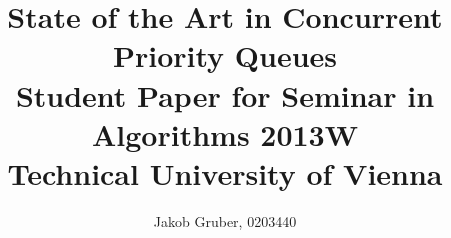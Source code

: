 \documentclass[a4paper,10pt]{article}
\title{State of the Art in Concurrent Priority Queues \\
       Student Paper for Seminar in Algorithms 2013W \\
       Technical University of Vienna}
\author{Jakob Gruber, 0203440}
\begin{document}
\maketitle

\begin{comment}
Abstract formula
----------------

1) big picture problem or topic widely debated in your field.
2) gap in the literature on this topic.
3) your project filling the gap.
4) the specific material that you examine in the paper.
5) your original argument.
6) a strong concluding sentence.

Introduction formula
--------------------

A good paper introduction is fairly formulaic. If you follow a simple set of
rules, you can write a very good introduction. The following outline can be
varied. For example, you can use two paragraphs instead of one, or you can
place more emphasis on one aspect of the intro than another. But in all cases,
all of the points below need to be covered in an introduction, and in most
papers, you don't need to cover anything more in an introduction.

Paragraph 1: Motivation. At a high level, what is the problem area you are
working in and why is it important? It is important to set the larger context
here. Why is the problem of interest and importance to the larger community?

Paragraph 2: What is the specific problem considered in this paper? This
paragraph narrows down the topic area of the paper. In the first paragraph you
have established general context and importance. Here you establish specific
context and background.

Paragraph 3: "In this paper, we show that ...". This is the key paragraph in
the intro - you summarize, in one paragraph, what are the main contributions of
your paper given the context you have established in paragraphs 1 and 2. What
is the general approach taken? Why are the specific results significant? This
paragraph must be really really good. If you can't "sell" your work at a high
level in a paragraph in the intro, then you are in trouble. As a reader or
reviewer, this is the paragraph that I always look for, and read very
carefully.

You should think about how to structure this one or two paragraph summary of
what your paper is all about. If there are two or three main results, then you
might consider itemizing them with bullets or in test (e.g., "First, ..."). If
the results fall broadly into two categories, you can bring out that
distinction here. For example, "Our results are both theoretical and applied in
nature. (two sentences follow, one each on theory and application)"


\end{comment}
\end{document}
